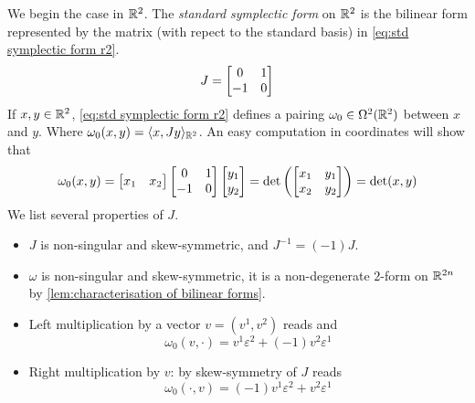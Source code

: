 \documentclass[../main-v2-manifolds.tex]{subfiles}
\begin{document}
\providecommand{\symatrix}{\begin{bmatrix}
    0 & 1 \\ -1 & 0
\end{bmatrix}}
\newcommand{\bigdot}[1]{\overset{\bullet}{#1}}
We begin the case in $\mathbb{R}^2$. The \emph{standard symplectic form} on $\mathbb{R}^2$ is the bilinear form represented by the matrix (with repect to the standard basis) in \cref{eq:std symplectic form r2}.
\begin{equation}
    J = \mqty[0 & 1\\ -1 & 0]
    \label{eq:std symplectic form r2}
\end{equation}
If $x,y\in\mathbb{R}^2$, \cref{eq:std symplectic form r2} defines a pairing $\omega_0\in \Omega^2(\mathbb{R}^2)$ between $x$ and $y$. Where $\omega_0(x,y) = \langle x, Jy\rangle_{\mathbb{R}^{2}}$. An easy computation in coordinates will show that
\begin{equation}
    \omega_0(x,y) = \begin{bmatrix}x_1 & x_2
    \end{bmatrix}\begin{bmatrix}0 & 1 \\ -1 & 0\end{bmatrix}\begin{bmatrix} y_1 \\ y_2\end{bmatrix} = \det\qty(\begin{bmatrix} x_1 & y_1 \\ x_2 & y_2\end{bmatrix}) = \det(x,y)
    \label{eq:std symplectic action pw r2}
\end{equation}
We list several properties of $J$.
\begin{itemize}
    \item $J$ is non-singular and skew-symmetric, and $J^{-1} = (-1)J$.
    \item $\omega$ is non-singular and skew-symmetric, it is a non-degenerate $2$-form on $\mathbb{R}^{2n}$ by \cref{lem:characterisation of bilinear forms}.
    \item Left multiplication by a vector $v = (v^1, v^2)$ reads 
    and
    \[
        \omega_0(v,\cdot) = v^1\varepsilon^{2} + (-1)v^2\varepsilon^1
    \]
    \item Right multiplication by $v$: by skew-symmetry of $J$ reads
    \[
        \omega_0(\cdot, v) = (-1)v^1\varepsilon^2 + v^2\varepsilon^1
    \]
\end{itemize}
\end{document}
